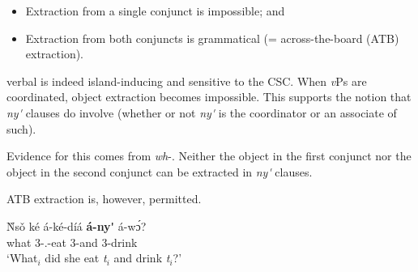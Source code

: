 \documentclass[output=paper]{../langsci/langscibook}
\begin{document}
\begin{itemize}
\item Extraction from a single conjunct is impossible; and
\item Extraction from both conjuncts is grammatical (= across-the-board (ATB) extraction).
\end{itemize}

\noindent {} verbal  is indeed island-inducing and sensitive to the CSC. When \textit{v}Ps are coordinated, object extraction becomes impossible. This supports the notion that \textit{ny\'{\textturnv}\ng} clauses do involve  (whether or not \textit{ny\'{\textturnv}\ng} is the coordinator or an associate of such).

Evidence for this comes from \textit{wh}-. Neither the object in the first conjunct nor the object in the second conjunct can be extracted in \textit{ny\'{\textturnv}\ng} clauses.

\ea\label{ex:duncan-et-al:13}
\z
\z

\noindent ATB extraction is, however, permitted.

\ea\label{ex:duncan-et-al:14}
\gll \`{N}s\v{o} k\'{e} \'{a}-k\'{e}-d\'{i}\'{a} \textbf{\'{a}-ny\'{\textturnv}\ng} \'{a}-\ng w\'ɔ\ng? \\
what {\foc} 3{\sg-\pst.\foc}-eat 3{\sg}-and 3{\sg}-drink \\
\glt `What$_i$ did she eat \textit{t}$_i$ and drink \textit{t}$_i$?'
\z
\end{document}
